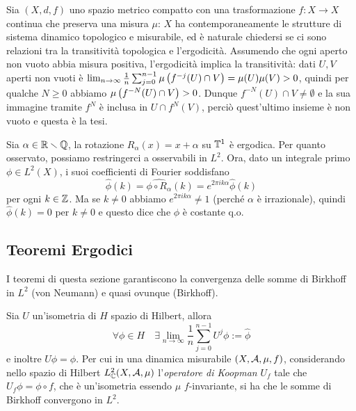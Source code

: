 \begin{oss}[facoltativa]Sia $(X,d,f)$ uno spazio metrico compatto con una trasformazione $f:X\to X$ continua che preserva
una misura $\mu$: $X$ ha contemporaneamente le strutture di sistema dinamico topologico
e misurabile, ed è naturale chiedersi se ci sono relazioni tra la transitività topologica e l'ergodicità.
Assumendo che ogni aperto non vuoto abbia misura positiva, l'ergodicità implica la transitività:
dati $U,V$ aperti non vuoti è $\lim_{n\to\infty}\frac{1}{n}\sum_{j=0}^{n-1}\mu\left(f^{-j}(U)\cap V\right)=\mu(U)\mu(V)>0$,
quindi per qualche $N\ge 0$ abbiamo $\mu\left(f^{-N}(U)\cap V\right)>0$.
Dunque $f^{-N}(U)\cap V\neq\emptyset$ e la sua immagine tramite $f^N$ è inclusa in $U\cap f^N(V)$, perciò
quest'ultimo insieme è non vuoto e questa è la tesi.
\end{oss}

\begin{esempio}Sia $\alpha\in\mathbb{R}\smallsetminus\mathbb{Q}$, la rotazione $R_\alpha(x)=x+\alpha$ su $\mathbb{T}^1$ è ergodica. Per quanto osservato, possiamo restringerci a osservabili in $L^2$.
Ora, dato un integrale primo $\phi\in L^2(X)$, i suoi coefficienti di Fourier soddisfano
\[ \widehat{\phi}(k)=\widehat{\phi\circ R_\alpha}(k)=e^{2\pi i k\alpha}\widehat{\phi}(k) \]
per ogni $k\in\mathbb{Z}$. Ma se $k\neq 0$ abbiamo $e^{2\pi i k\alpha}\neq 1$ (perché $\alpha$ è irrazionale), quindi
$\widehat{\phi}(k)=0$ per $k\neq 0$ e questo dice che $\phi$ è costante q.o.
\end{esempio}




\subsection{Teoremi Ergodici}

I teoremi di questa sezione garantiscono la convergenza delle somme di Birkhoff in $L^2$ (von Neumann) e quasi ovunque (Birkhoff).

\begin{teo} Sia $U$ un'isometria di $H$ spazio di Hilbert, allora
 \[\forall\phi\in H \quad \exists \lim_{n\rightarrow\infty}\frac{1}{n}\sum_{j=0}^{n-1}U^j\phi:=\hat\phi\]
 e inoltre $U\hat\phi=\phi$. Per cui in una dinamica misurabile $(X,\mathcal{A},\mu,f)$, considerando nello spazio di Hilbert $L^2_{\mathbb{C}}(X,\mathcal{A},\mu)$ l'\emph{operatore di Koopman} $U_f$ tale che $U_f \phi=\phi\circ f$, che è un'isometria essendo $\mu$ $f$-invariante, si ha che le somme di Birkhoff convergono in $L^2$. 
 \end{teo}

